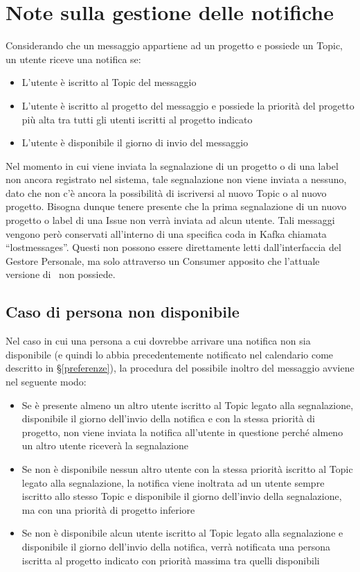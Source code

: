 \section{Note sulla gestione delle notifiche}\label{note}
Considerando che un messaggio appartiene ad un progetto e possiede un  Topic, un utente riceve una notifica se:
\begin{itemize}
    \item L'utente è iscritto al Topic del messaggio
    \item L'utente è iscritto al progetto del messaggio e possiede la priorità del progetto più alta tra tutti gli utenti iscritti al progetto indicato
    \item L'utente è disponibile il giorno di invio del messaggio
\end{itemize}

Nel momento in cui viene inviata la segnalazione di un progetto o di una label non ancora registrato nel sistema, tale segnalazione non viene inviata a nessuno, dato che non c'è ancora la possibilità di iscriversi al nuovo Topic o al nuovo progetto. Bisogna dunque tenere presente che la prima segnalazione di un nuovo progetto o label di una Issue non verrà inviata ad alcun utente. Tali messaggi vengono però conservati all'interno di una specifica coda in Kafka chiamata ``lostmessages''. Questi non possono essere direttamente letti dall'interfaccia del Gestore Personale, ma solo attraverso un Consumer apposito che l'attuale versione di \progetto\ non possiede.

\subsection{Caso di persona non disponibile}
Nel caso in cui una persona a cui dovrebbe arrivare una notifica non sia disponibile (e quindi lo abbia precedentemente notificato nel calendario come descritto in \S\ref{preferenze}), la procedura del possibile inoltro del messaggio avviene nel seguente modo:
\begin{itemize}
    \item Se è presente almeno un altro utente iscritto al Topic legato alla segnalazione, disponibile
    il giorno dell’invio della notifica e con la stessa priorità di progetto, non viene inviata la
    notifica all’utente in questione perché almeno un altro utente riceverà la segnalazione
    \item Se non è disponibile nessun altro utente con la stessa priorità iscritto al Topic legato alla
    segnalazione, la notifica viene inoltrata ad un utente sempre iscritto allo stesso Topic e
    disponibile il giorno dell’invio della segnalazione, ma con una priorità di progetto inferiore
    \item Se non è disponibile alcun utente iscritto al Topic legato alla segnalazione e disponibile
    il giorno dell’invio della notifica, verrà notificata una persona iscritta al progetto indicato
    con priorità massima tra quelli disponibili
\end{itemize}
